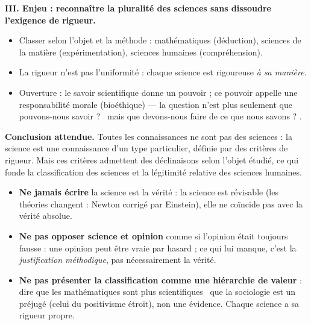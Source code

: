 \documentclass[11pt]{article}
\begin{document}
\begin{exoresolu}
\textbf{III. Enjeu : reconnaître la pluralité des sciences sans dissoudre l'exigence de rigueur.}
\begin{itemize}
\item Classer selon l'objet et la méthode : mathématiques (déduction), sciences de la matière (expérimentation), sciences humaines (compréhension).
\item La rigueur n'est pas l'uniformité : chaque science est rigoureuse \emph{à sa manière}.
\item Ouverture : le savoir scientifique donne un pouvoir ; ce pouvoir appelle une responsabilité morale (bioéthique) — la question n'est plus seulement \guillemotleft que pouvons-nous savoir ? \guillemotright\ mais \guillemotleft que devons-nous faire de ce que nous savons ? \guillemotright.
\end{itemize}

\textbf{Conclusion attendue.} Toutes les connaissances ne sont pas des sciences : la science est une connaissance d'un type particulier, définie par des critères de rigueur. Mais ces critères admettent des déclinaisons selon l'objet étudié, ce qui fonde la classification des sciences et la légitimité relative des sciences humaines.
\end{exoresolu}

\begin{attention}
\begin{itemize}
\item \textbf{Ne jamais écrire} \guillemotleft la science est la vérité \guillemotright : la science est révisable (les théories changent : Newton corrigé par Einstein), elle ne coïncide pas avec la vérité absolue.
\item \textbf{Ne pas opposer science et opinion} comme si l'opinion était toujours fausse : une opinion peut être vraie par hasard ; ce qui lui manque, c'est la \emph{justification méthodique}, pas nécessairement la vérité.
\item \textbf{Ne pas présenter la classification comme une hiérarchie de valeur} : dire que les mathématiques sont \guillemotleft plus scientifiques \guillemotright\ que la sociologie est un préjugé (celui du positivisme étroit), non une évidence. Chaque science a sa rigueur propre.
\end{itemize}
\end{attention}
\end{document}

